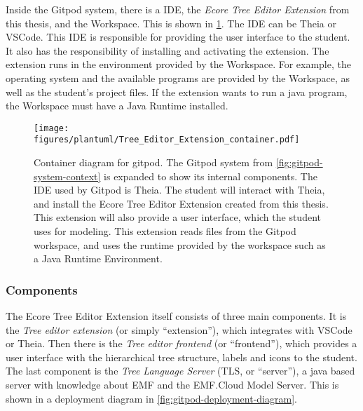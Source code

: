 Inside the \gls{Gitpod} system, there is a \acrshort{IDE}, the \textit{Ecore Tree Editor Extension} from this thesis, and the Workspace.
This is shown in \cref{fig:gitpod-container-diagram}.
The \acrshort{IDE} can be \gls{Theia} or \gls{VSCode}.
This \acrshort{IDE} is responsible for providing the user interface to the student.
It also has the responsibility of installing and activating the extension.
The extension runs in the environment provided by the Workspace.
For example, the operating system and the available programs are provided by the Workspace, as well as the student's project files.
If the extension wants to run a java program, the Workspace must have a Java Runtime installed.

\begin{figure}[H]  %
  \centering
  \texttt{[image: figures/plantuml/Tree\_Editor\_Extension\_container.pdf]}
  \caption[Gitpod container diagram]{Container diagram for gitpod. The Gitpod system from \cref{fig:gitpod-system-context} is expanded to show its internal components. The \acrshort{IDE} used by Gitpod is \gls{Theia}.
  The student will interact with Theia, and install the Ecore Tree Editor Extension created from this thesis.
  This extension will also provide a user interface, which the student uses for modeling.
  This extension reads files from the Gitpod workspace, and uses the runtime provided by the workspace such as a Java Runtime Environment.}\label{fig:gitpod-container-diagram}
\end{figure}


\subsubsection{Components}

The Ecore Tree Editor Extension itself consists of three main components.
It is the \textit{Tree editor extension} (or simply ``extension''), which integrates with \gls{VSCode} or \gls{Theia}.
Then there is the \textit{Tree editor frontend} (or ``frontend''), which provides a user interface with the hierarchical tree structure, labels and icons to the student.
The last component is the \textit{Tree Language Server} (TLS, or ``server''), a java based server with knowledge about \acrshort{EMF} and the EMF.Cloud Model Server.
This is shown in a deployment diagram in \cref{fig:gitpod-deployment-diagram}.\\


